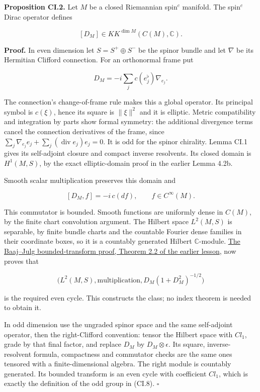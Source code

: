 \documentclass[
  11pt,
]{article}
\begin{document}
\textbf{Proposition CI.2.} Let \(M\) be a closed Riemannian spin\(^{c}\)
manifold. The spin\(^{c}\) Dirac operator defines

\[
 [D_M]\in KK^{\dim M}(C(M),\mathbb C).
 \tag{CI.8}
\]

\textbf{Proof.} In even dimension let \(S=S^+\oplus S^-\) be the spinor
bundle and let \(\nabla\) be its Hermitian Clifford connection. For an
orthonormal frame put

\[
 D_M=-i\sum_j c(e_j^\flat)\nabla_{e_j}.
 \tag{CI.9}
\]

The connection's change-of-frame rule makes this a global operator. Its
principal symbol is \(c(\xi)\), hence its square is \(\|\xi\|^2\) and it
is elliptic. Metric compatibility and integration by parts show formal
symmetry: the additional divergence terms cancel the connection
derivatives of the frame, since
\(\sum_j\nabla_{e_j}e_j+\sum_j(\operatorname{div}e_j)e_j=0\). It is odd
for the spinor chirality. Lemma CI.1 gives its self-adjoint closure and
compact inverse resolvents. Its closed domain is \(H^1(M,S)\), by the
exact elliptic-domain proof in the earlier Lemma 4.2b.

Smooth scalar multiplication preserves this domain and

\[
 [D_M,f]=-i\,c(df),\qquad f\in C^\infty(M).
 \tag{CI.10}
\]

This commutator is bounded. Smooth functions are uniformly dense in
\(C(M)\), by the finite chart convolution argument. The Hilbert space
\(L^2(M,S)\) is separable, by finite bundle charts and the countable
Fourier dense families in their coordinate boxes, so it is a countably
generated Hilbert \(\mathbb C\)-module.
\href{KT-KK-11.html\#2-the-bounded-transform}{The Baaj--Julg
bounded-transform proof, Theorem 2.2 of the earlier lesson}, now proves
that

\[
 \big(L^2(M,S),\text{multiplication},
      D_M(1+D_M^2)^{-1/2}\big)
 \tag{CI.11}
\]

is the required even cycle. This constructs the class; no index theorem
is needed to obtain it.

In odd dimension use the ungraded spinor space and the same self-adjoint
operator, then the right-Clifford convention: tensor the Hilbert space
with \(Cl_1\), grade by that final factor, and replace \(D_M\) by
\(D_M\otimes\epsilon\). Its square, inverse-resolvent formula,
compactness and commutator checks are the same ones tensored with a
finite-dimensional algebra. The right module is countably generated. Its
bounded transform is an even cycle with coefficient \(Cl_1\), which is
exactly the definition of the odd group in (CI.8). \(\square\)
\end{document}
